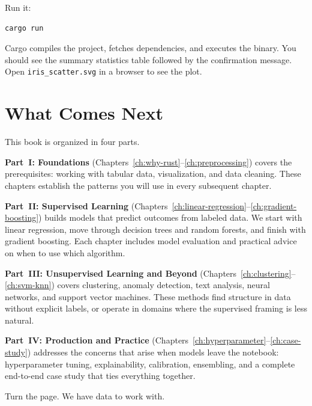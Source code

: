 Run it:

\begin{lstlisting}[language=bash, numbers=none]
cargo run
\end{lstlisting}

Cargo compiles the project, fetches dependencies, and executes the binary. You
should see the summary statistics table followed by the confirmation message.
Open \texttt{iris\_scatter.svg} in a browser to see the plot.


\section{What Comes Next}
\label{sec:what-next}

This book is organized in four parts.

\textbf{Part~I: Foundations} (Chapters~\ref{ch:why-rust}--\ref{ch:preprocessing})
covers the prerequisites: working with tabular data, visualization, and data
cleaning. These chapters establish the patterns you will use in every subsequent
chapter.

\textbf{Part~II: Supervised Learning}
(Chapters~\ref{ch:linear-regression}--\ref{ch:gradient-boosting}) builds models
that predict outcomes from labeled data. We start with linear regression, move
through decision trees and random forests, and finish with gradient boosting.
Each chapter includes model evaluation and practical advice on when to use which
algorithm.

\textbf{Part~III: Unsupervised Learning and Beyond}
(Chapters~\ref{ch:clustering}--\ref{ch:svm-knn}) covers clustering, anomaly
detection, text analysis, neural networks, and support vector machines. These
methods find structure in data without explicit labels, or operate in domains
where the supervised framing is less natural.

\textbf{Part~IV: Production and Practice}
(Chapters~\ref{ch:hyperparameter}--\ref{ch:case-study}) addresses the concerns
that arise when models leave the notebook: hyperparameter tuning,
explainability, calibration, ensembling, and a complete end-to-end case study
that ties everything together.

Turn the page. We have data to work with.
